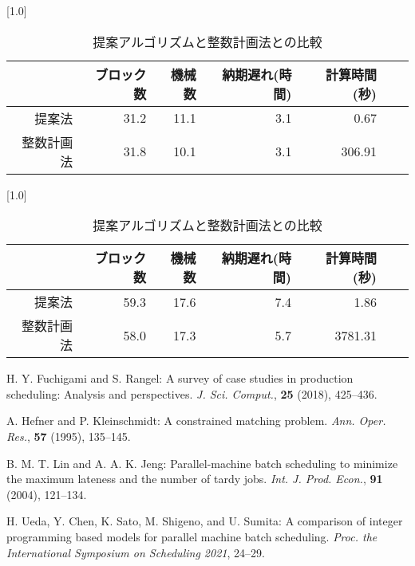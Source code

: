 \documentclass[twoside,twocolumn,11pt]{jarticle}  %
\begin{document}
\begin{table}[htbp]
    \caption{提案アルゴリズムと整数計画法との比較}
    \label{tab: experiment}
    \small
    \centering
    \scalebox{0.69}[1.0]{
        \begin{tabular}{r|rrrrrr} \hline
             & ブロック数 & 機械数 & 納期遅れ(時間) & 計算時間(秒) \\ \hline \hline
            提案法 & 31.2 & 11.1 & 3.1 & 0.67 \\ \hline
            整数計画法 & 31.8 & 10.1 & 3.1 & 306.91 \\ \hline
        \end{tabular}
    }
    \scalebox{0.69}[1.0]{
        \begin{tabular}{r|rrrrrr} \hline
             & ブロック数 & 機械数 & 納期遅れ(時間) & 計算時間(秒) \\ \hline \hline
            提案法 & 59.3 & 17.6 & 7.4 & 1.86 \\ \hline
            整数計画法 & 58.0 & 17.3 & 5.7 & 3781.31 \\ \hline
        \end{tabular}
    }
\end{table}

\begin{thebibliography}{9}
H. Y. Fuchigami and S. Rangel: A survey of case studies in production scheduling: Analysis and perspectives. \textit{J. Sci. Comput.}, \textbf{25} (2018), 425--436.

A. Hefner and P. Kleinschmidt: A constrained matching problem. \textit{Ann. Oper. Res.}, \textbf{57} (1995), 135--145.

B. M. T. Lin and A. A. K. Jeng: Parallel-machine batch scheduling to minimize the maximum lateness and the number of tardy jobs. \textit{Int. J. Prod. Econ.}, \textbf{91} (2004), 121--134.

H. Ueda, Y. Chen, K. Sato, M. Shigeno, and U. Sumita:
\newblock A comparison of integer programming based models for parallel machine batch scheduling.
\textit{Proc. the International Symposium on Scheduling 2021}, 24--29.
\end{thebibliography}
\end{document}
